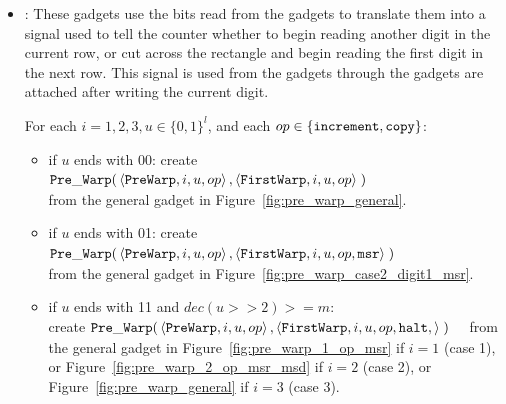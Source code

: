    \begin{itemize}
        \item {\prewarp}: These gadgets use the bits read from the {\cread} gadgets to translate them into
                          a signal used to tell the counter whether to begin reading
                          another digit in the current row, or cut across the rectangle and begin reading the
                          first digit in the next row. This signal is used from the {\prewarp} gadgets through
                          the {\dtop} gadgets are attached after writing the current digit.

            For each $i = 1,2,3, u \in \{0, 1\}^l$, and each $op \in \{ {\tt increment, copy } \}$:
            \begin{itemize}


            \item if $u$ ends with 00:
            create
            $\begin{aligned}[t]
                {\tt Pre\_Warp}(& \left\langle {\tt PreWarp},   i, u, op \right\rangle,
                           \left\langle {\tt FirstWarp}, i, u, op \right\rangle \;)
            \end{aligned}$ \\ from the general gadget in Figure~\ref{fig:pre_warp_general}.

            \item if $u$ ends with 01:
            create
            $\begin{aligned}[t]
                {\tt Pre\_Warp}(& \left\langle {\tt PreWarp},   i, u, op \right\rangle,
                           \left\langle {\tt FirstWarp}, i, u, op, {\tt msr} \right\rangle \;)
            \end{aligned}$ \\ from the general gadget in Figure~\ref{fig:pre_warp_case2_digit1_msr}.


            \item if $u$ ends with 11 and $dec(u >> 2) >= m$:\\
            create
            $\begin{aligned}[t]
                {\tt Pre\_Warp}(& \left\langle {\tt PreWarp},   i, u, op \right\rangle,
                \left\langle {\tt FirstWarp}, i, u, op, {\tt halt},  \right\rangle \;)
            \end{aligned}$ from the general gadget in Figure~\ref{fig:pre_warp_1_op_msr} if $i = 1$ (case 1),
            or Figure~\ref{fig:pre_warp_2_op_msr_msd} if $i = 2$ (case 2), or Figure~\ref{fig:pre_warp_general} if $i = 3$ (case 3).



\end{itemize}
\end{itemize}
